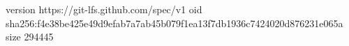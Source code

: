 version https://git-lfs.github.com/spec/v1
oid sha256:f4e38be425e49d9efab7a7ab45b079f1ea13f7db1936c7424020d876231e065a
size 294445
